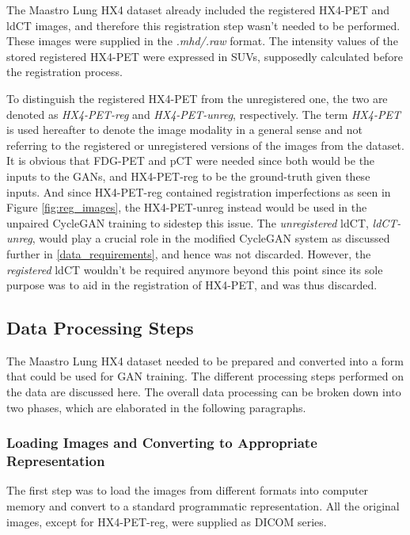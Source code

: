 The Maastro Lung HX4 dataset already included the registered HX4-PET and ldCT images, and therefore this registration step wasn't needed to be performed. These images were supplied in the \textit{.mhd/.raw} format. The intensity values of the stored registered HX4-PET were expressed in SUVs, supposedly calculated before the registration process. 

To distinguish the registered HX4-PET from the unregistered one, the two are denoted as \textit{HX4-PET-reg} and \textit{HX4-PET-unreg}, respectively. The term \textit{HX4-PET} is used hereafter to denote the image modality in a general sense and not referring to the registered or unregistered versions of the images from the dataset. It is obvious that FDG-PET and pCT were needed since both would be the inputs to the GANs, and HX4-PET-reg to be the ground-truth given these inputs. And since HX4-PET-reg contained registration imperfections as seen in Figure \ref{fig:reg_images}, the HX4-PET-unreg instead would be used in the unpaired CycleGAN training to sidestep this issue. The \textit{unregistered} ldCT, \textit{ldCT-unreg}, would play a crucial role in the modified CycleGAN system as discussed further in \ref{data_requirements}, and hence was not discarded. However, the \textit{registered} ldCT wouldn't be required anymore beyond this point since its sole purpose was to aid in the registration of HX4-PET, and was thus discarded.


\subsection{Data Processing Steps}
\label{Data_Processing}
The Maastro Lung HX4 dataset needed to be prepared and converted into a form that could be used for GAN training. The different processing steps performed on the data are discussed here. The overall data processing can be broken down into two phases, which are elaborated in the following paragraphs. 

\subsubsection{Loading Images and Converting to Appropriate Representation}
The first step was to load the images from different formats into computer memory and convert to a standard programmatic representation. All the original images, except for HX4-PET-reg, were supplied as DICOM series. 

